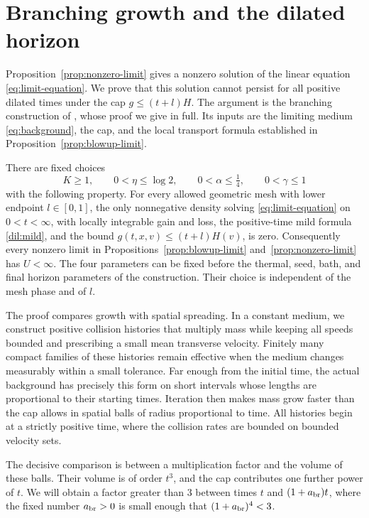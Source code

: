 \section{Branching growth and the dilated horizon}\label{sec:branching}

Proposition~\ref{prop:nonzero-limit} gives a nonzero solution of the
linear equation \eqref{eq:limit-equation}. We prove that this solution
cannot persist for all positive dilated times under the cap
\(g\le(t+l)H\). The argument is the branching construction of
\cite[Section~9]{OpenAIPeriodic}, whose proof we give in full. Its inputs
are the limiting medium \eqref{eq:background}, the cap, and the local
transport formula established in Proposition~\ref{prop:blowup-limit}.

\begin{proposition}\label{prop:finite-dilated-horizon}
There are fixed choices
\[
K\ge1,\qquad 0<\eta\le\log2,\qquad
0<\alpha\le\tfrac14,\qquad 0<\gamma\le1
\]
with the following property. For every allowed geometric mesh with
lower endpoint \(l\in[0,1]\), the only nonnegative density solving
\eqref{eq:limit-equation} on \(0<t<\infty\), with locally integrable
gain and loss, the positive-time mild formula \eqref{dil:mild}, and the
bound \(g(t,x,v)\le(t+l)H(v)\), is zero.
Consequently every nonzero limit in
Propositions~\ref{prop:blowup-limit} and~\ref{prop:nonzero-limit} has
\(U<\infty\). The four parameters can be fixed before the thermal,
seed, bath, and final horizon parameters of the construction. Their
choice is independent of the mesh phase and of \(l\).
\end{proposition}

The proof compares growth with spatial spreading. In a constant medium,
we construct positive collision histories that multiply mass while
keeping all speeds bounded and prescribing a small mean transverse
velocity. Finitely many compact families of these histories remain
effective when the medium changes measurably within a small tolerance. Far enough from
the initial time, the actual background has precisely this form on
short intervals whose lengths are proportional to their starting times.
Iteration then makes mass grow faster than the cap allows in spatial
balls of radius proportional to time. All histories begin at a strictly
positive time, where the collision rates are bounded on bounded velocity
sets.

The decisive comparison is between a multiplication factor and the
volume of these balls. Their volume is of order \(t^3\), and the cap
contributes one further power of \(t\). We will obtain a factor greater
than \(3\) between times \(t\) and \((1+a_{\rm br})t\), where the fixed number
\(a_{\rm br}>0\) is small enough that \((1+a_{\rm br})^4<3\).

